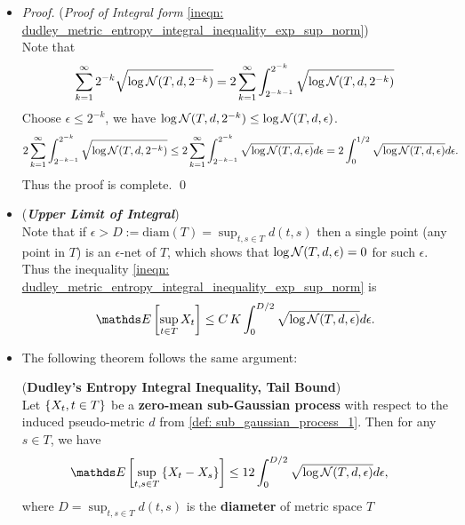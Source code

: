 \documentclass[11pt]{article}
\begin{document}
\begin{itemize}
\item \begin{proof} (\emph{Proof of Integral form} \eqref{ineqn: dudley_metric_entropy_integral_inequality_exp_sup_norm})\\
Note that 
\begin{align*}
\sum_{k=1}^{\infty} 2^{-k} \sqrt{\log {\mathcal N}(T, d, 2^{-k}) } = 2\sum_{k=1}^{\infty} \int_{2^{-k-1}}^{2^{-k}} \sqrt{\log {\mathcal N}(T, d, 2^{-k}) }
\end{align*} Choose $\epsilon \le 2^{-k}$, we have $\log {\mathcal N}(T, d, 2^{-k}) \le \log {\mathcal N}(T, d, \epsilon)$.
\begin{align*}
2\sum_{k=1}^{\infty} \int_{2^{-k-1}}^{2^{-k}} \sqrt{\log {\mathcal N}(T, d, 2^{-k}) } &\le 2\sum_{k=1}^{\infty} \int_{2^{-k-1}}^{2^{-k}} \sqrt{\log {\mathcal N}(T, d, \epsilon) } d\epsilon =  2 \int_{0}^{1/2}\sqrt{\log {\mathcal N}(T, d, \epsilon) } d\epsilon.
\end{align*} Thus the proof is complete. \qed
\end{proof}

\item \begin{remark} (\textbf{\emph{Upper Limit of Integral}})\\
Note that if $\epsilon > D := \text{diam}(T) = \sup_{t, s\in T}d(t, s)$ then a single point (any point in $T$) is an $\epsilon$-net of $T$, which shows that $\log {\mathcal N}(T, d, \epsilon) = 0$ for such $\epsilon$. Thus the inequality \eqref{ineqn: dudley_metric_entropy_integral_inequality_exp_sup_norm} is 
\begin{align*}
\E{}{\sup_{t\in T}X_t } \le C\,K\int_{0}^{D/2} \sqrt{\log \cN(T, d, \epsilon)} d\epsilon.
\end{align*}
\end{remark}

\item The following theorem follows the same argument:
\begin{theorem} (\textbf{Dudley's Entropy Integral Inequality, Tail Bound}) \citep{boucheron2013concentration}\\
Let $\left\{X_{t}, t \in T\right\}$ be a \textbf{zero-mean sub-Gaussian process}  with respect to the induced pseudo-metric $d$ from \eqref{def: sub_gaussian_process_1}. Then for any $s \in T$,  we have
\begin{align}
\E{}{\sup_{t, s \in T}\set{X_t - X_{s}}} &\le  12 \int_{0}^{D/2}\sqrt{\log \cN(T, d, \epsilon)} d\epsilon, \label{ineqn: dudley_metric_entropy_integral_inequality_tail_difference}
\end{align} where $D  = \sup_{t, s\in T}d(t, s)$ is the \textbf{diameter} of metric space $T$
\end{theorem}


\end{itemize}
\end{document}
